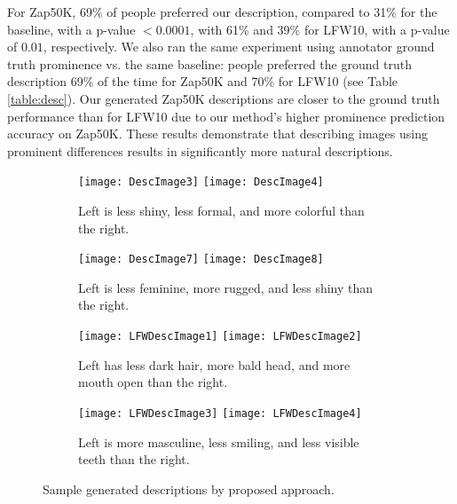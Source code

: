 \documentclass[10pt,twocolumn,letterpaper]{article}
\begin{document}
For Zap50K, 69\% of people preferred our description, compared to 31\% for the baseline, with a p-value $< 0.0001$,  with 61\% and 39\% for LFW10, with a p-value of $0.01$, respectively. We also ran the same experiment using annotator ground truth prominence vs. the same baseline: people preferred the ground truth description 69\% of the time for Zap50K and 70\% for LFW10 (see Table \ref{table:desc}). Our generated Zap50K descriptions are closer to the ground truth performance than for LFW10 due to our method's higher prominence prediction accuracy on Zap50K. These results demonstrate that describing images using prominent differences results in significantly more natural descriptions.

\begin{figure}
    \centering
    \captionsetup[subfigure]{justification=centering,font=footnotesize,labelfont=footnotesize}
    
    \begin{subfigure}[c]{0.475\linewidth}
        \centering
        \texttt{[image: DescImage3]}
        \texttt{[image: DescImage4]}
        \caption{Left is less shiny, less formal, and more colorful than the right.}
        \label{fig:good1}
    \end{subfigure}
    \hfill
    \begin{subfigure}[c]{0.475\linewidth}
        \centering
        \texttt{[image: DescImage7]}
        \texttt{[image: DescImage8]}
        \caption{Left is less feminine, more rugged, and less shiny than the right.}
        \label{fig:good2}
    \end{subfigure}
    
    \vspace{0.15cm}
    
    \begin{subfigure}[c]{0.475\linewidth}
        \centering
        \texttt{[image: LFWDescImage1]}
        \texttt{[image: LFWDescImage2]}
        \caption{Left has less dark hair, more bald head, and more mouth open than the right.}
        \label{fig:good5}
    \end{subfigure}
    \hfill
    \begin{subfigure}[c]{0.475\linewidth}
        \centering
        \texttt{[image: LFWDescImage3]}
        \texttt{[image: LFWDescImage4]}
        \caption{Left is more masculine, less smiling, and less visible teeth than the right.}
        \label{fig:good6}
    \end{subfigure}
    
    \vspace{0.1cm}
    
    \caption[Sample Textual Descriptions]{Sample generated descriptions by proposed approach.}
    \label{fig:descexamples}
\end{figure}
\end{document}
